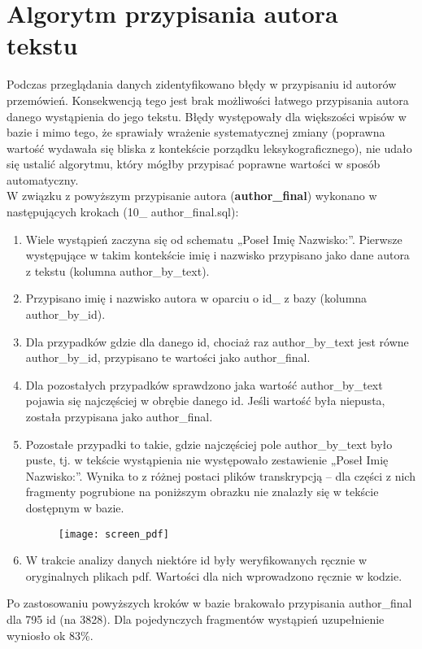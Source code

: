 \documentclass[a4paper,11pt,twoside]{report}
\theoremstyle{definition}
\begin{document}
\section{Algorytm przypisania autora tekstu}
\label{section:autor}

Podczas przeglądania danych zidentyfikowano błędy w przypisaniu id autorów przemówień. Konsekwencją tego jest brak możliwości łatwego przypisania autora danego wystąpienia do jego tekstu. Błędy występowały dla większości wpisów w bazie i mimo tego, że sprawiały wrażenie systematycznej zmiany (poprawna wartość wydawała się bliska z kontekście porządku leksykograficznego), nie udało się ustalić algorytmu, który mógłby przypisać poprawne wartości w sposób automatyczny.  \\
W związku z powyższym przypisanie autora (\textbf{author\_final}) wykonano w następujących krokach (10\_ author\_final.sql):
\begin{enumerate}
\item Wiele wystąpień zaczyna się od schematu „Poseł Imię Nazwisko:”. Pierwsze występujące w takim kontekście imię i nazwisko przypisano jako dane autora z tekstu (kolumna author\_by\_text).
\item Przypisano imię i nazwisko autora w oparciu o id\_ z bazy (kolumna author\_by\_id).
\item Dla przypadków gdzie dla danego id, chociaż raz author\_by\_text jest równe author\_by\_id, przypisano te wartości jako author\_final.
\item Dla pozostałych przypadków sprawdzono jaka wartość author\_by\_text pojawia się najczęściej w obrębie danego id. Jeśli wartość była niepusta, została przypisana jako author\_final.
\item Pozostałe przypadki to takie, gdzie najczęściej pole author\_by\_text było puste, tj. w tekście wystąpienia nie występowało zestawienie „Poseł Imię Nazwisko:”. Wynika to z różnej postaci plików  transkrypcją – dla części z nich fragmenty pogrubione na poniższym obrazku nie znalazły się w tekście dostępnym w bazie.
\begin{figure}[h]
\texttt{[image: screen\_pdf]}
\centering
\end{figure}
\item W trakcie analizy danych niektóre id były weryfikowanych ręcznie w oryginalnych plikach pdf. Wartości dla nich wprowadzono ręcznie w kodzie.
\end{enumerate}
Po zastosowaniu powyższych kroków w bazie brakowało przypisania author\_final dla 795 id (na 3828). Dla pojedynczych fragmentów wystąpień uzupełnienie wyniosło ok 83\%.
\end{document}
